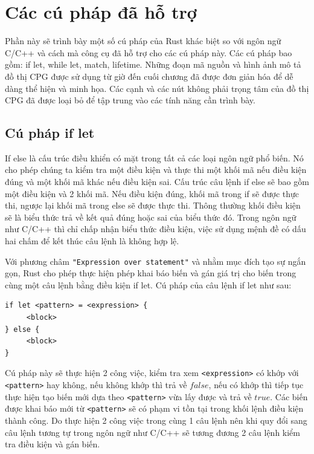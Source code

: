 \section{Các cú pháp đã hỗ trợ}

Phần này sẽ trình bày một số cú pháp của Rust khác biệt so với ngôn ngữ C/C++ và cách mà công cụ đã hỗ trợ cho các cú pháp này.
Các cú pháp bao gồm: if let, while let, match, lifetime.
Những đoạn mã nguồn và hình ảnh mô tả đồ thị CPG được sử dụng từ giờ đến cuối chương đã được đơn giản hóa để dễ dàng thể hiện và minh họa.
Các cạnh và các nút không phải trọng tâm của đồ thị CPG đã được loại bỏ để tập trung vào các tính năng cần trình bày.

\subsection{Cú pháp if let}
If else là cấu trúc điều khiển có mặt trong tất cả các loại ngôn ngữ phổ biến.
Nó cho phép chúng ta kiểm tra một điều kiện và thực thi một khối mã nếu điều kiện đúng và một khối mã khác nếu điều kiện sai.
Cấu trúc câu lệnh if else sẽ bao gồm một điều kiện và 2 khối mã.
Nếu điều kiện đúng, khối mã trong if sẽ được thực thi, ngược lại khối mã trong else sẽ được thực thi.
Thông thường khối điều kiện sẽ là biểu thức trả về kết quả đúng hoặc sai của biểu thức đó.
Trong ngôn ngữ như C/C++ thì chỉ chấp nhận biểu thức điều kiện, việc sử dụng mệnh đề có dấu hai chấm để kết thúc câu lệnh là không hợp lệ.

Với phương châm \texttt{"Expression over statement"} và nhằm mục đích tạo sự ngắn gọn, Rust cho phép thực hiện phép khai báo biến và gán giá trị cho biến trong cùng một câu lệnh bằng điều kiện if let.
Cú pháp của câu lệnh if let như sau:

\begin{verbatim}
if let <pattern> = <expression> {
     <block>
} else {
     <block>
}
\end{verbatim}


Cú pháp này sẽ thực hiện 2 công việc, kiểm tra xem \texttt{<expression>} có khớp với \texttt{<pattern>} hay không, nếu không khớp thì trả về $false$, nếu có khớp thì tiếp tục thực hiện tạo biến mới dựa theo \texttt{<pattern>} vừa lấy được và trả về $true$.
Các biến được khai báo mới từ \texttt{<pattern>} sẽ có phạm vi tồn tại trong khối lệnh điều kiện thành công.
Do thực hiện 2 công việc trong cùng 1 câu lệnh nên khi quy đổi sang câu lệnh tương tự trong ngôn ngữ như C/C++ sẽ tương đương 2 câu lệnh kiểm tra điều kiện và gán biến.

